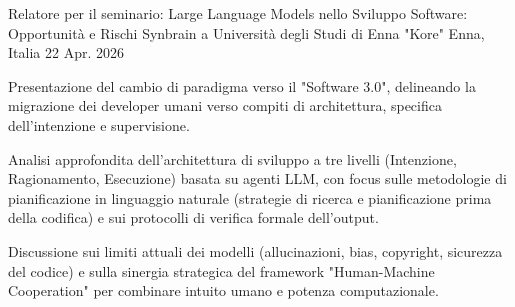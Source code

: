 

\begin{cventries}

  \cventry
    {Relatore per il seminario: Large Language Models nello Sviluppo Software: Opportunità e Rischi} %
    {Synbrain a Università degli Studi di Enna "Kore"} %
    {Enna, Italia} %
    {22 Apr. 2026} %
    {
      \begin{cvitems} %
        \item {Presentazione del cambio di paradigma verso il "Software 3.0", delineando la migrazione dei developer umani verso compiti di architettura, specifica dell'intenzione e supervisione.}
        \item {Analisi approfondita dell'architettura di sviluppo a tre livelli (Intenzione, Ragionamento, Esecuzione) basata su agenti LLM, con focus sulle metodologie di pianificazione in linguaggio naturale (strategie di ricerca e pianificazione prima della codifica) e sui protocolli di verifica formale dell'output.}
        \item {Discussione sui limiti attuali dei modelli (allucinazioni, bias, copyright, sicurezza del codice) e sulla sinergia strategica del framework "Human-Machine Cooperation" per combinare intuito umano e potenza computazionale.}
      \end{cvitems}
    }

\end{cventries}